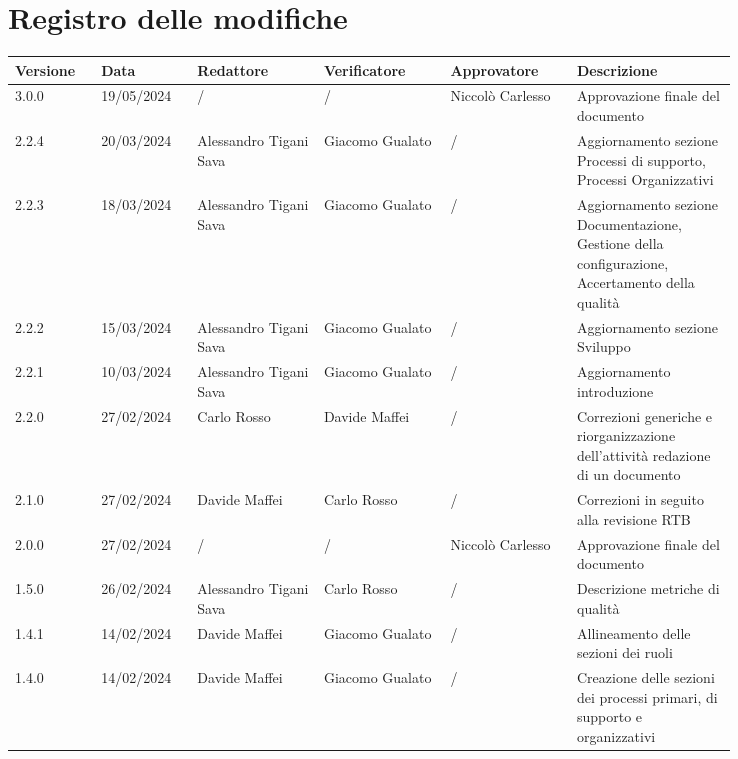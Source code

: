 \section*{Registro delle modifiche}
 {
  \scriptsize
  \begin{longtable}{p{0.10\linewidth}p{0.10\linewidth}p{0.15\linewidth}p{0.15\linewidth}p{0.15\linewidth}p{0.19\linewidth}}
	  \textbf{Versione} & \textbf{Data} & \textbf{Redattore}     & \textbf{Verificatore} & \textbf{Approvatore} & \textbf{Descrizione}	\\
	  \toprule
	  3.0.0	& 19/05/2024    & / 					 & /				& Niccolò Carlesso	& Approvazione finale del documento	\\
	  \hline
	  2.2.4	& 20/03/2024    & Alessandro Tigani Sava & Giacomo Gualato	& /					& Aggiornamento sezione Processi di supporto, Processi Organizzativi	\\
	  \hline
	  2.2.3	& 18/03/2024    & Alessandro Tigani Sava & Giacomo Gualato	& /					& Aggiornamento sezione Documentazione, Gestione della configurazione, Accertamento della qualità	\\
	  \hline
	  2.2.2	& 15/03/2024    & Alessandro Tigani Sava & Giacomo Gualato	& /					& Aggiornamento sezione Sviluppo	\\
	  \hline
	  2.2.1	& 10/03/2024    & Alessandro Tigani Sava & Giacomo Gualato	& /					& Aggiornamento introduzione	\\
	  \hline
	  2.2.0	& 27/02/2024    & Carlo Rosso            & Davide Maffei	& /					& Correzioni generiche e riorganizzazione dell'attività redazione di un documento	\\
	  \hline
	  2.1.0	& 27/02/2024    & Davide Maffei          & Carlo Rosso		& /					& Correzioni in seguito alla revisione RTB                                                                                                 \\
	  \hline
	  2.0.0	& 27/02/2024    & /                      & /				& Niccolò Carlesso	& Approvazione finale del documento	\\
	  \hline
	  1.5.0	& 26/02/2024    & Alessandro Tigani Sava & Carlo Rosso		& /					& Descrizione metriche di qualità	\\
	  \hline
	  1.4.1	& 14/02/2024    & Davide Maffei          & Giacomo Gualato	& /					& Allineamento delle sezioni dei ruoli	\\
	  \hline
	  1.4.0	& 14/02/2024    & Davide Maffei          & Giacomo Gualato	& /					& Creazione delle sezioni dei processi primari, di supporto e organizzativi	\\

\end{longtable}}
